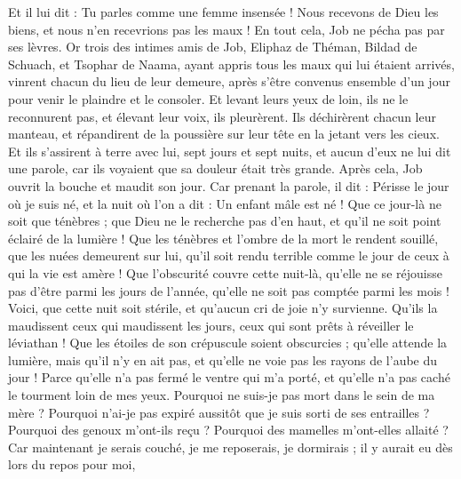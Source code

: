 \begin{multicols}{2}
Et il lui dit : Tu parles comme une femme insensée ! Nous recevons de Dieu les biens, et nous n'en recevrions pas les maux ! En tout cela, Job ne pécha pas par ses lèvres.
Or trois des intimes amis de Job, Eliphaz de Théman, Bildad de Schuach, et Tsophar de Naama, ayant appris tous les maux qui lui étaient arrivés, vinrent chacun du lieu de leur demeure, après s'être convenus ensemble d'un jour pour venir le plaindre et le consoler.
Et levant leurs yeux de loin, ils ne le reconnurent pas, et élevant leur voix, ils pleurèrent. Ils déchirèrent chacun leur manteau, et répandirent de la poussière sur leur tête en la jetant vers les cieux.
Et ils s'assirent à terre avec lui, sept jours et sept nuits, et aucun d'eux ne lui dit une parole, car ils voyaient que sa douleur était très grande.
\VerseOne{}Après cela, Job ouvrit la bouche et maudit son jour.
Car prenant la parole, il dit :
Périsse le jour où je suis né, et la nuit où l'on a dit : Un enfant mâle est né !
Que ce jour-là ne soit que ténèbres ; que Dieu ne le recherche pas d'en haut, et qu'il ne soit point éclairé de la lumière ! 
Que les ténèbres et l'ombre de la mort le rendent souillé, que les nuées demeurent sur lui, qu'il soit rendu terrible comme le jour de ceux à qui la vie est amère ! 
Que l'obscurité couvre cette nuit-là, qu'elle ne se réjouisse pas d'être parmi les jours de l'année, qu'elle ne soit pas comptée parmi les mois !
Voici, que cette nuit soit stérile, et qu'aucun cri de joie n'y survienne.
Qu'ils la maudissent ceux qui maudissent les jours, ceux qui sont prêts à réveiller le léviathan !
Que les étoiles de son crépuscule soient obscurcies ; qu'elle attende la lumière, mais qu'il n'y en ait pas, et qu'elle ne voie pas les rayons de l'aube du jour !
Parce qu'elle n'a pas fermé le ventre qui m'a porté, et qu'elle n'a pas caché le tourment loin de mes yeux.
Pourquoi ne suis-je pas mort dans le sein de ma mère ? Pourquoi n'ai-je pas expiré aussitôt que je suis sorti de ses entrailles ?
Pourquoi des genoux m'ont-ils reçu ? Pourquoi des mamelles m'ont-elles allaité ?
Car maintenant je serais couché, je me reposerais, je dormirais ; il y aurait eu dès lors du repos pour moi,

\end{multicols}
